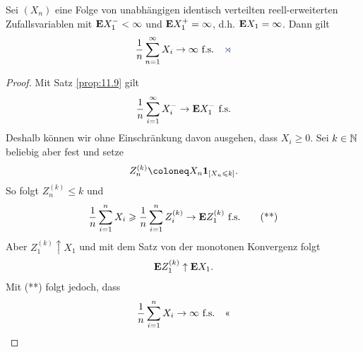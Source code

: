 \begin{cor}
Sei $(X_n)$ eine Folge von unabhängigen identisch verteilten
reell-erweiterten Zufallsvariablen mit $\textbf{E} X_1^- < \infty$ und $\textbf{E} X_1^+ =
\infty$, d.h. $\textbf{E} X_1 = \infty$. Dann gilt
\begin{align*}
\frac{1}{n}\sum_{n=1}^\infty X_i \to \infty\fs\fishhere
\end{align*}
\end{cor}
\begin{proof}
Mit Satz \ref{prop:11.9} gilt
\begin{align*}
\frac{1}{n}\sum_{i=1}^\infty X_i^- \to \textbf{E} X_1^- \ \text{f.s.}
\end{align*}
Deshalb können wir ohne Einschränkung davon ausgehen, dass $X_i \ge 0$. Sei
$k\in\mathbb{N}$ beliebig aber fest und setze
\begin{align*}
Z_n^{(k)} \defl X_n \Id_{[X_n \le k]}.
\end{align*}
So folgt $Z_n^{(k)} \le k$ und
\begin{align*}
\frac{1}{n}\sum_{i=1}^n X_i \geqslant
\frac{1}{n}\sum_{i=1}^n Z_i^{(k)}
\to \textbf{E} Z_1^{(k)} \ \text{f.s.}\tag{**}
\end{align*}
Aber $Z_1^{(k)}\uparrow X_1$ und mit dem Satz von der monotonen Konvergenz folgt
\begin{align*}
\textbf{E} Z_1^{(k)}\uparrow \textbf{E} X_1.
\end{align*}
Mit (**) folgt jedoch, dass
\begin{align*}
\frac{1}{n}\sum_{i=1}^n X_i \to \infty \ \text{f.s.}\quad\text{<<}
\end{align*}
\end{proof}
% 
% 
